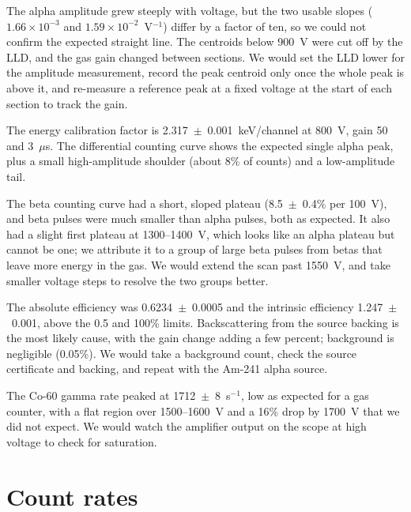 \documentclass[12pt]{article}
\begin{document}
The alpha amplitude grew steeply with voltage, but the two usable slopes ($1.66\times10^{-3}$ and $1.59\times10^{-2}$~V$^{-1}$) differ by a factor of ten, so we could not confirm the expected straight line. The centroids below 900~V were cut off by the LLD, and the gas gain changed between sections. We would set the LLD lower for the amplitude measurement, record the peak centroid only once the whole peak is above it, and re-measure a reference peak at a fixed voltage at the start of each section to track the gain.

The energy calibration factor is 2.317~$\pm$~0.001~keV/channel at 800~V, gain 50 and 3~$\mu$s. The differential counting curve shows the expected single alpha peak, plus a small high-amplitude shoulder (about 8\% of counts) and a low-amplitude tail.

The beta counting curve had a short, sloped plateau (8.5~$\pm$~0.4\% per 100~V), and beta pulses were much smaller than alpha pulses, both as expected. It also had a slight first plateau at 1300--1400~V, which looks like an alpha plateau but cannot be one; we attribute it to a group of large beta pulses from betas that leave more energy in the gas. We would extend the scan past 1550~V, and take smaller voltage steps to resolve the two groups better.

The absolute efficiency was 0.6234~$\pm$~0.0005 and the intrinsic efficiency 1.247~$\pm$~0.001, above the 0.5 and 100\% limits. Backscattering from the source backing is the most likely cause, with the gain change adding a few percent; background is negligible (0.05\%). We would take a background count, check the source certificate and backing, and repeat with the Am-241 alpha source.

The Co-60 gamma rate peaked at 1712~$\pm$~8~s$^{-1}$, low as expected for a gas counter, with a flat region over 1500--1600~V and a 16\% drop by 1700~V that we did not expect. We would watch the amplifier output on the scope at high voltage to check for saturation.



\appendix
\section{Count rates}
\label{app:rates}
\end{document}
